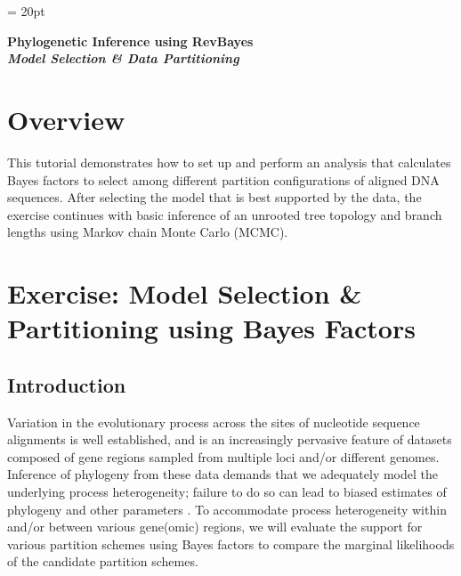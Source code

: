 \documentclass[11pt]{article}
\begin{document}
\renewcommand{\headrulewidth}{0.5pt}
\headsep = 20pt
\lhead{ }

\thispagestyle{plain}
\begin{center}

\textbf{\LARGE Phylogenetic Inference using RevBayes}\\\vspace{2mm}
\textbf{\it{\Large Model Selection \& Data Partitioning}}\\\vspace{2mm}
\end{center}

\section*{Overview}
 

This tutorial demonstrates how to set up and perform an analysis that calculates Bayes factors to select among different partition configurations of aligned DNA sequences. 
After selecting the model that is best supported by the data, the exercise continues with basic inference of an unrooted tree topology and branch lengths using Markov chain Monte Carlo (MCMC). 





%
%
\newpage
\FloatBarrier
\section{Exercise: Model Selection \& Partitioning using Bayes Factors}

\subsection{Introduction}
%
%

Variation in the evolutionary process across the sites of nucleotide 
sequence alignments is well established, and is an increasingly pervasive feature of datasets 
composed of gene regions sampled from multiple loci and/or different genomes.
Inference of phylogeny from these data demands that we adequately model the underlying process heterogeneity; 
failure to do so can lead to biased estimates of phylogeny and other parameters \citep{brown07}.
To accommodate process heterogeneity within and/or between various gene(omic)
regions, we will evaluate the support for various partition schemes 
using Bayes factors to compare the marginal likelihoods of the candidate partition schemes.
\end{document}
